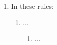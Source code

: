 \begin{landscape}
\begin{longtable}
        
    \end{longtable}
\end{landscape}


\begin{enumerate}
    \item In these rules:
    \begin{enumerate}
        \item ...
        \begin{enumerate}
            \item ...
        \end{enumerate}
    \end{enumerate}    
\end{enumerate}



